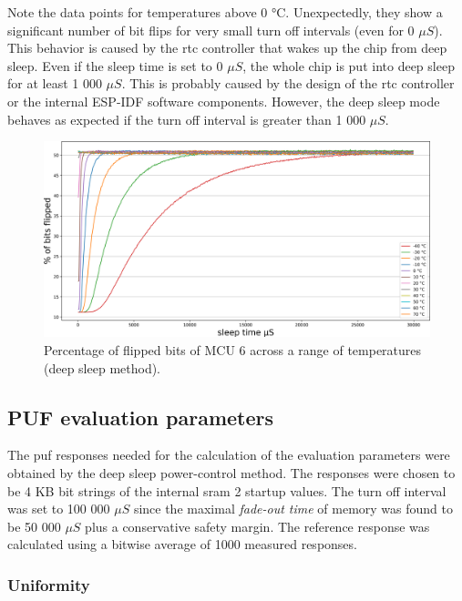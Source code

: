 Note the data points for temperatures above 0 °C. Unexpectedly, they show a significant number of bit flips for very small turn off intervals (even for 0 $\mu{}S$). This behavior is caused by the \gls{rtc} controller that wakes up the chip from deep sleep. Even if the sleep time is set to 0 $\mu{}S$, the whole chip is put into deep sleep for at least 1 000 $\mu{}S$. This is probably caused by the design of the \gls{rtc} controller or the internal ESP-IDF software components. However, the deep sleep mode behaves as expected if the turn off interval is greater than 1 000 $\mu{}S$.

\begin{figure}[ht!]
    \centering
    \captionsetup{justification=centering,margin=0.5cm}
    \includegraphics[width=\textwidth]{images/6_across_temps_deep_sleep.png}
    \caption{Percentage of flipped bits of MCU 6 across a range of temperatures (deep sleep method).}
    \label{fig:6_across_temps_deep_sleep}
\end{figure}
\subsection{PUF evaluation parameters}\label{sec:deepsleep_evaluation}

The \gls{puf} responses needed for the calculation of the evaluation parameters were obtained by the deep sleep power-control method. The responses were chosen to be 4 KB bit strings of the internal \gls{sram} 2 startup values. The turn off interval was set to 100 000 $\mu{}S$ since the maximal \emph{fade-out time} of memory was found to be 50 000 $\mu{}S$ plus a conservative safety margin. The reference response was calculated using a bitwise average of 1000 measured responses.

\subsubsection*{Uniformity}

